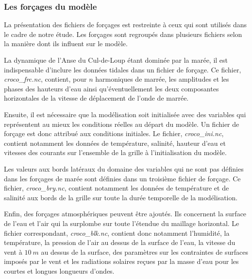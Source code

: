 \documentclass[10pt,a4paper,titlepage]{article}
\begin{document}

\subsubsection{Les forçages du modèle}
\label{subsub:forcages}
La présentation des fichiers de forçages est restreinte à ceux qui sont utilisés dans le cadre de notre étude.
Les forçages sont regroupés dans plusieurs fichiers selon la manière dont ils influent sur le modèle.

La dynamique de l'Anse du Cul-de-Loup étant dominée par la marée, il est indispensable d'inclure les données tidales dans un fichier de forçage.
Ce fichier, \textit{croco\_frc.nc}, contient, pour $n$ harmoniques de marrée, les amplitudes et les phases des hauteurs d'eau ainsi qu'éventuellement les deux composantes horizontales de la vitesse de déplacement de l'onde de marrée.


Ensuite, il est nécessaire que la modélisation soit initialisée avec des variables qui représentent au mieux les conditions réelles au départ du modèle.
Un fichier de forçage est donc attribué aux conditions initiales.
Le fichier, \textit{croco\_ini.nc}, contient notamment les données de température, salinité, hauteur d'eau et vitesses des courants sur l'ensemble de la grille à l'initialisation du modèle.


Les valeurs aux bords latéraux du domaine des variables qui ne sont pas définies dans les forçages de marée sont définies dans un troisième fichier de forçage.
Ce fichier, \textit{croco\_bry.nc}, contient notamment les données de température et de salinité %
aux bords de la grille sur toute la durée temporelle de la modélisation.

Enfin, des forçages atmosphériques peuvent être ajoutés.
Ils concernent la surface de l'eau et l'air qui la surplombe sur toute l'étendue du maillage horizontal.
Le fichier correspondant, \textit{croco\_blk.nc}, contient donc notamment l'humidité, la température, la pression de l'air au dessus de la surface de l'eau, la vitesse du vent à $10~m$ au dessus de la surface, des paramètres sur les contraintes de surfaces imposés par le vent et les radiations solaires reçues par la masse d'eau pour les courtes et longues longueurs d'ondes.
\end{document}
